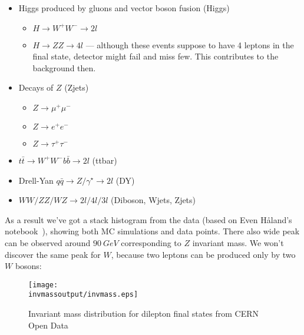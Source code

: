 \documentclass{article}
\newcommand{\invmassoutput}{../invmass/output}
\begin{document}
\begin{itemize}
    \item Higgs produced by gluons and vector boson fusion (Higgs)
    \begin{itemize}
        \item $H \rightarrow W^{+}W^{-} \rightarrow 2l$
        \item $H \rightarrow ZZ \rightarrow 4l$ --- although these events suppose to have 4 leptons in the final state, detector might fail and miss few. This contributes to the background then.
\end{itemize}
    \item Decays of $Z$ (Zjets)
    \begin{itemize}
        \item $Z \rightarrow \mu^{+} \mu^{-}$
        \item $Z \rightarrow e^{+} e^{-}$
        \item $Z \rightarrow \tau^{+} \tau^{-}$
    \end{itemize}
    \item $t \bar{t} \rightarrow W^{+} W^{-} b \bar{b} \rightarrow 2l$ (ttbar)
    \item Drell-Yan $q \bar{q} \rightarrow Z / \gamma^{\star} \rightarrow 2l$ (DY)
    \item $WW/ZZ/WZ \rightarrow 2l/4l/3l$ (Diboson, Wjets, Zjets)
\end{itemize}

As a result we've got a stack histogram from the data (based on Even Håland's notebook~\cite{url:even-dilepton}), showing both MC simulations and data points. There also wide peak can be observed around $90~GeV$ corresponding to $Z$ invariant mass. We won't discover the same peak for $W$, because two leptons can be produced only by two $W$ bosons:

\begin{figure}[H]
    \centering
    \texttt{[image: \\invmassoutput/invmass.eps]}
    \caption{Invariant mass distribution for dilepton final states from CERN Open Data}%
    \label{fig:invmass-open-data}
\end{figure}

\printbibliography{}
\end{document}
